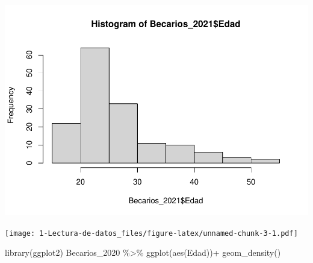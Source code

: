 \documentclass[
]{article}
\newenvironment{Shaded}{\begin{snugshade}}{\end{snugshade}}
\newcommand{\CommentTok}[1]{\textcolor[rgb]{0.56,0.35,0.01}{\textit{#1}}}
\newcommand{\FunctionTok}[1]{\textcolor[rgb]{0.00,0.00,0.00}{#1}}
\newcommand{\NormalTok}[1]{#1}
\newcommand{\SpecialCharTok}[1]{\textcolor[rgb]{0.00,0.00,0.00}{#1}}
\begin{document}
\begin{Shaded}
\end{Shaded}

\includegraphics{1-Lectura-de-datos_files/figure-latex/Histograma-2.pdf}

\begin{Shaded}
\end{Shaded}

\begin{Shaded}
\end{Shaded}

\texttt{[image: 1-Lectura-de-datos\_files/figure-latex/unnamed-chunk-3-1.pdf]}

\begin{Shaded}
\begin{Highlighting}[]
\FunctionTok{library}\NormalTok{(ggplot2)}
\NormalTok{Becarios\_2020 }\SpecialCharTok{\%\textgreater{}\%} 
  \FunctionTok{ggplot}\NormalTok{(}\FunctionTok{aes}\NormalTok{(Edad))}\SpecialCharTok{+}
  \FunctionTok{geom\_density}\NormalTok{()}
\end{Highlighting}
\end{Shaded}
\end{document}
